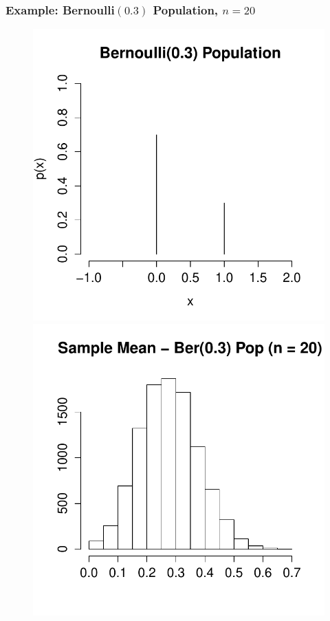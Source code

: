 \documentclass[handout]{beamer}
\begin{document}
\begin{frame}
\frametitle{Example: Bernoulli$(0.3)$ Population, $n =20$}
\begin{figure}
\centering
\includegraphics[scale = 0.4]{./images/bernoulli}
\includegraphics[scale = 0.4]{./images/xbar_bernoulli}
\end{figure}
\end{frame}
\end{document}
